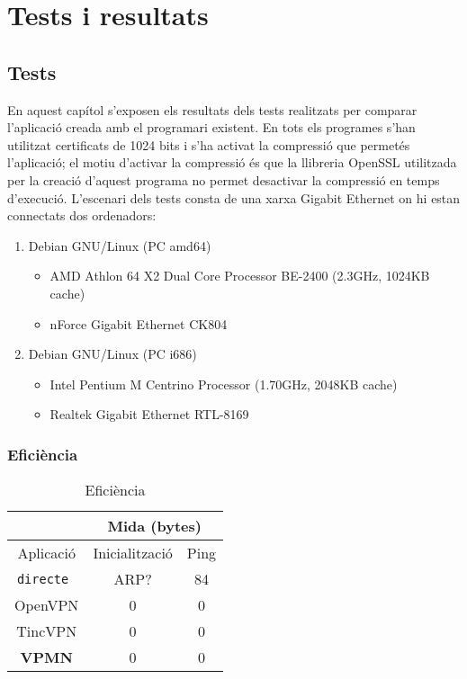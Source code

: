 \chapter{Tests i resultats}
\section{Tests}
En aquest capítol s'exposen els resultats dels tests realitzats per comparar l'aplicació creada amb el programari existent.
En tots els programes s'han utilitzat certificats de 1024 bits i s'ha activat la compressió que permetés l'aplicació; el motiu d'activar la compressió és que la llibreria OpenSSL utilitzada per la creació d'aquest programa no permet desactivar la compressió en temps d'execució.
L'escenari dels tests consta de una xarxa Gigabit Ethernet on hi estan connectats dos ordenadors:
\begin{enumerate}
\item Debian GNU/Linux (PC amd64)
\begin{itemize}
\item AMD Athlon 64 X2 Dual Core Processor BE-2400 (2.3GHz, 1024KB cache)
\item nForce Gigabit Ethernet CK804
\end{itemize}
\item Debian GNU/Linux (PC i686)
\begin{itemize}
\item Intel Pentium M Centrino Processor (1.70GHz, 2048KB cache)
\item Realtek Gigabit Ethernet RTL-8169
\end{itemize}
\end{enumerate}
\subsection{Eficiència}
\begin{table}[htb]
\begin{center}
\begin{tabular}{|c|c|c|}
\multicolumn{1}{c}{} & \multicolumn{2}{|c|}{Mida (bytes)} \\ \hline
Aplicació & Inicialització & Ping \\ \hline \hline
\tt directe & ARP? & 84 \\ \hline
OpenVPN & 0 & 0 \\ \hline
TincVPN & 0 & 0 \\ \hline
\bf VPMN & 0 & 0 \\ \hline
\end{tabular}
\end{center}
\begin{center}
\caption{Eficiència}
\label{T:efi}
\end{center}
\end{table}

